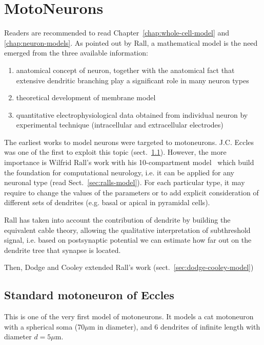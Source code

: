 
\chapter{MotoNeurons}
\label{chap:models-motoneurons}

Readers are recommended to read Chapter~\ref{chap:whole-cell-model} and
\ref{chap:neuron-models}. As pointed out by Rall, a mathematical model
is the need emerged from the three available information:
\begin{enumerate}
\item anatomical concept of neuron, together with the anatomical fact
  that extensive dendritic branching play a significant role in many
  neuron types
\item theoretical development of membrane model
\item quantitative electrophysiological data obtained from individual
  neuron by experimental technique (intracellular and extracellular
  electrodes)
\end{enumerate}
The earliest works to model neurons were targeted to
motoneurons. J.C. Eccles was one of the first to exploit this topic
(sect.~\ref{sec:stand-moton-eccl}). However, the more importance is
Wilfrid Rall's work with his 10-compartment model~\citep{rall1967dts}
which build the foundation for computational neurology, i.e. it can be
applied for any neuronal type (read Sect.~\ref{sec:ralls-model}). For
each particular type, it may require to change the values of the
parameters or to add explicit consideration of different sets of
dendrites (e.g. basal or apical in pyramidal cells).

Rall has taken into account the contribution of dendrite by building
the equivalent cable theory, allowing the qualitative interpretation
of subthreshold signal, i.e. based on postsynaptic potential we can
estimate how far out on the dendrite tree that synapse is located. 

Then, Dodge and Cooley extended Rall's work
(sect.~\ref{sec:dodge-cooley-model})

\section{Standard motoneuron of Eccles}
\label{sec:stand-moton-eccl}

This is one of the very first model of
motoneurons\citep{eccles1957pnc}. It models a cat motoneuron with a
spherical soma (70$\mu$m in diameter), and 6 dendrites of infinite
length with diameter $d=5\mu$m. 

